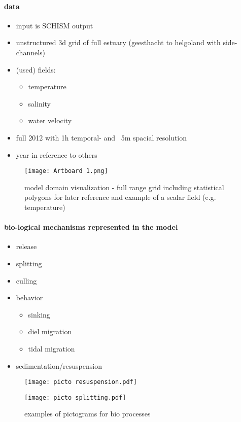 \paragraph{data}
\begin{itemize}
    \item input is SCHISM output
    \item unstructured 3d grid of full estuary (geesthacht to helgoland with side-channels)
    \item (used) fields:
    \begin{itemize}
        \item temperature
        \item salinity
        \item water velocity 
    \end{itemize}
    \item full 2012 with 1h temporal- and ~5m spacial resolution
    \item year in reference to others
\end{itemize}
\begin{figure}
    \texttt{[image: Artboard 1.png]}
    \caption{model domain visualization - full range grid including statistical polygons for later reference and example of a scalar field (e.g. temperature)}
    \label{fig:statistial polygons}
\end{figure}

\paragraph{bio-logical mechanisms represented in the model}
\begin{itemize}
    \item release
    \item splitting
    \item culling
    \item behavior
    \begin{itemize}
        \item sinking
        \item diel migration
        \item tidal migration
    \end{itemize}
    \item sedimentation/resuspension
\end{itemize}

\begin{figure}
    \centering
    \begin{minipage}{.4\columnwidth}
        \centering
        \texttt{[image: picto resuspension.pdf]}
    \end{minipage}
    \begin{minipage}{.4\columnwidth}
    \centering
        \texttt{[image: picto splitting.pdf]}
    \end{minipage}
    \caption{examples of pictograms for bio processes}
\end{figure}


